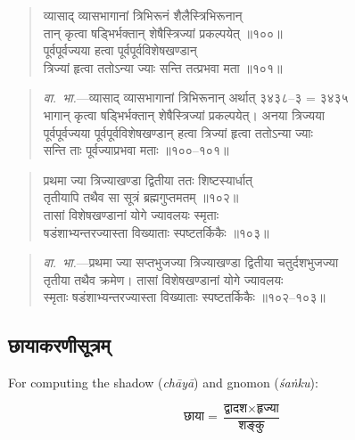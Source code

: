 \documentclass[11pt,a4paper]{article}
\newcommand{\dev}[1]{{\devanagarifont #1}}
\newenvironment{shloka}{%
  \begin{quote}
  \small
  \setlength{\leftmargin}{2em}
  \devanagarifont
}{\end{quote}}
\newenvironment{vyakhya}{%
  \begin{quote}
  \small
  \setlength{\leftmargin}{1em}
  \devanagarifont
}{\end{quote}}
\newcommand{\skt}[1]{{\devanagarifont #1}}
\begin{document}
\begin{shloka}
\skt{व्यासाद् व्यासभागानां त्रिभिरूनं शैलैस्त्रिभिरूनान्}\\[0.3em]
\skt{तान् कृत्वा षड्भिर्भक्तान् शेषैस्त्रिज्यां प्रकल्पयेत् ॥१००॥}\\[0.3em]
\skt{पूर्वपूर्वज्यया हत्वा पूर्वपूर्वविशेषखण्डान्}\\[0.3em]
\skt{त्रिज्यां हृत्वा ततोऽन्या ज्याः सन्ति तत्प्रभवा मता ॥१०१॥}
\end{shloka}

\begin{vyakhya}
\textit{वा.~भा.}—\skt{व्यासाद् व्यासभागानां त्रिभिरूनान् अर्थात् ३४३८--३ = ३४३५}\\
\skt{भागान् कृत्वा षड्भिर्भक्तान् शेषैस्त्रिज्यां प्रकल्पयेत्। अनया त्रिज्यया}\\
\skt{पूर्वपूर्वज्यया पूर्वपूर्वविशेषखण्डान् हत्वा त्रिज्यां हृत्वा ततोऽन्या ज्याः}\\
\skt{सन्ति ताः पूर्वज्याप्रभवा मताः ॥१००--१०१॥}
\end{vyakhya}

\begin{shloka}
\skt{प्रथमा ज्या त्रिज्याखण्डा द्वितीया ततः शिष्टस्यार्धात्}\\[0.3em]
\skt{तृतीयापि तथैव सा सूत्रं ब्रह्मगुप्तमतम् ॥१०२॥}\\[0.3em]
\skt{तासां विशेषखण्डानां योगे ज्यावलयः स्मृताः}\\[0.3em]
\skt{षडंशाभ्यन्तरज्यास्ता विख्याताः स्पष्टतर्किकैः ॥१०३॥}
\end{shloka}

\begin{vyakhya}
\textit{वा.~भा.}—\skt{प्रथमा ज्या सप्तभुजज्या त्रिज्याखण्डा द्वितीया चतुर्दशभुजज्या}\\
\skt{तृतीया तथैव क्रमेण। तासां विशेषखण्डानां योगे ज्यावलयः}\\
\skt{स्मृताः षडंशाभ्यन्तरज्यास्ता विख्याताः स्पष्टतर्किकैः ॥१०२--१०३॥}
\end{vyakhya}

\subsection{\dev{छायाकरणीसूत्रम्}}

For computing the shadow (\textit{chāyā}) and gnomon (\textit{śaṅku}):

\begin{equation}
\text{छाया} = \frac{\text{द्वादश} \times \text{हृज्या}}{\text{शङ्कु}}
\end{equation}
\end{document}
